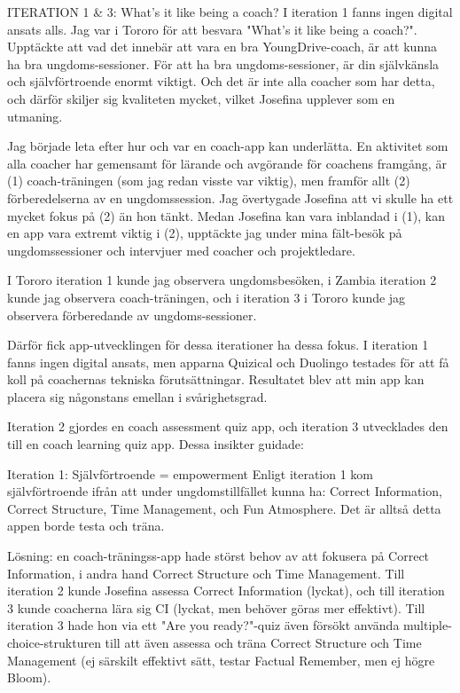ITERATION 1 \& 3: What's it like being a coach? 
I iteration 1 fanns ingen digital ansats alls. Jag var i Tororo för att besvara "What's it like being a coach?". Upptäckte att vad det innebär att vara en bra YoungDrive-coach, är att kunna ha bra ungdoms-sessioner. För att ha bra ungdoms-sessioner, är din självkänsla och självförtroende enormt viktigt. Och det är inte alla coacher som har detta, och därför skiljer sig kvaliteten mycket, vilket Josefina upplever som en utmaning.

Jag började leta efter hur och var en coach-app kan underlätta. En aktivitet som alla coacher har gemensamt för lärande och avgörande för coachens framgång, är (1) coach-träningen (som jag redan visste var viktig), men framför allt (2) förberedelserna av en ungdomssession. Jag övertygade Josefina att vi skulle ha ett mycket fokus på (2) än hon tänkt. Medan Josefina kan vara inblandad i (1), kan en app vara extremt viktig i (2), upptäckte jag under mina fält-besök på ungdomssessioner och intervjuer med coacher och projektledare.

I Tororo iteration 1 kunde jag observera ungdomsbesöken, i Zambia iteration 2 kunde jag observera coach-träningen, och i iteration 3 i Tororo kunde jag observera förberedande av ungdoms-sessioner.

Därför fick app-utvecklingen för dessa iterationer ha dessa fokus. I iteration 1 fanns ingen digital ansats, men apparna Quizical och Duolingo testades för att få koll på coachernas tekniska förutsättningar. Resultatet blev att min app kan placera sig någonstans emellan i svårighetsgrad.

Iteration 2 gjordes en coach assessment quiz app, och iteration 3 utvecklades den till en coach learning quiz app. Dessa insikter guidade:

Iteration 1: Självförtroende = empowerment
Enligt iteration 1 kom självförtroende ifrån att under ungdomstillfället kunna ha: Correct Information, Correct Structure, Time Management, och Fun Atmosphere. Det är alltså detta appen borde testa och träna.

Lösning: en coach-träningss-app hade störst behov av att fokusera på Correct Information, i andra hand Correct Structure och Time Management. Till iteration 2 kunde Josefina assessa Correct Information (lyckat), och till iteration 3 kunde coacherna lära sig CI (lyckat, men behöver göras mer effektivt). Till iteration 3 hade hon via ett "Are you ready?"-quiz även försökt använda multiple-choice-strukturen till att även assessa och träna Correct Structure och Time Management (ej särskilt effektivt sätt, testar Factual Remember, men ej högre Bloom). 

